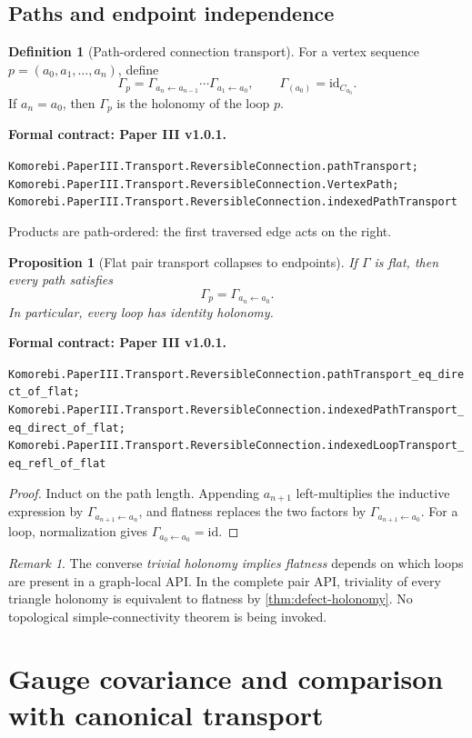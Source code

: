 \documentclass[11pt,a4paper]{article}
\theoremstyle{plain}
\newtheorem{proposition}[proposition]{Proposition}
\theoremstyle{definition}
\newtheorem{definition}[definition]{Definition}
\theoremstyle{remark}
\newtheorem{remark}[remark]{Remark}
\newcommand{\id}{\mathrm{id}}
\newcommand{\leanname}[1]{\nolinkurl{#1}}
\newcommand{\statusleanthree}[1]{\par\smallskip\noindent\begin{minipage}{\linewidth}{\color{leanblue}\textbf{Formal contract: Paper III v1.0.1.}}\par\begingroup\small\raggedright\leanname{#1}\par\endgroup\end{minipage}\par\smallskip}
\begin{document}
\subsection{Paths and endpoint independence}

\begin{definition}[Path-ordered connection transport]
\label{def:path-transport}
For a vertex sequence
$p=(a_0,a_1,\ldots,a_n)$, define
\[
\Gamma_p
=
\Gamma_{a_n\leftarrow a_{n-1}}\cdots
\Gamma_{a_1\leftarrow a_0},
\qquad
\Gamma_{(a_0)}=\id_{C_{a_0}}.
\]
If $a_n=a_0$, then $\Gamma_p$ is the holonomy of the loop $p$.
\end{definition}
\statusleanthree{Komorebi.PaperIII.Transport.ReversibleConnection.pathTransport; Komorebi.PaperIII.Transport.ReversibleConnection.VertexPath; Komorebi.PaperIII.Transport.ReversibleConnection.indexedPathTransport}

Products are path-ordered: the first traversed edge acts on the right.

\begin{proposition}[Flat pair transport collapses to endpoints]
\label{prop:flat-endpoints}
If $\Gamma$ is flat, then every path satisfies
\[
\Gamma_p=\Gamma_{a_n\leftarrow a_0}.
\]
In particular, every loop has identity holonomy.
\end{proposition}
\statusleanthree{Komorebi.PaperIII.Transport.ReversibleConnection.pathTransport_eq_direct_of_flat; Komorebi.PaperIII.Transport.ReversibleConnection.indexedPathTransport_eq_direct_of_flat; Komorebi.PaperIII.Transport.ReversibleConnection.indexedLoopTransport_eq_refl_of_flat}

\begin{proof}
Induct on the path length.  Appending $a_{n+1}$ left-multiplies the
inductive expression by $\Gamma_{a_{n+1}\leftarrow a_n}$, and flatness
replaces the two factors by
$\Gamma_{a_{n+1}\leftarrow a_0}$.  For a loop, normalization gives
$\Gamma_{a_0\leftarrow a_0}=\id$.
\end{proof}

\begin{remark}
The converse \emph{trivial holonomy implies flatness} depends on which loops
are present in a graph-local API.  In the complete pair API, triviality of
every triangle holonomy is equivalent to flatness by
\cref{thm:defect-holonomy}.  No topological simple-connectivity theorem is
being invoked.
\end{remark}

\section{Gauge covariance and comparison with canonical transport}
\label{sec:gauge}
\end{document}

